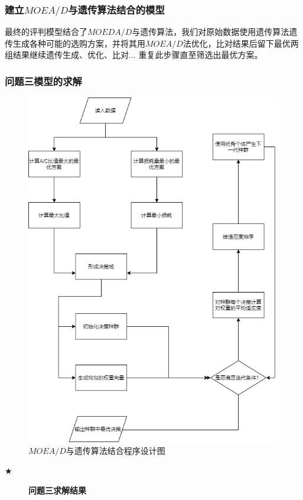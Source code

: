 \documentclass{cumcmthesis}
\begin{document}
\subsubsection*{建立$MOEA/D$与遗传算法结合的模型}
最终的评判模型结合了$MOEDA/D$与遗传算法，我们对原始数据使用遗传算法遗传生成各种可能的选购方案，并将其用$MOEA/D$法优化，比对结果后留下最优两组结果继续遗传生成、优化、比对$\dots$
重复此步骤直至筛选出最优方案。

\subsubsection{问题三模型的求解}
\begin{figure}[H]
    \centering
    \includegraphics[scale = 0.5]{three.png}
    \centering
    \caption{$MOEA/D$与遗传算法结合程序设计图} \label{fig:6}
\end{figure}
\begin{description}

    \item[$\bigstar$] \textbf{问题三求解结果}
\end{description}
\end{document}
